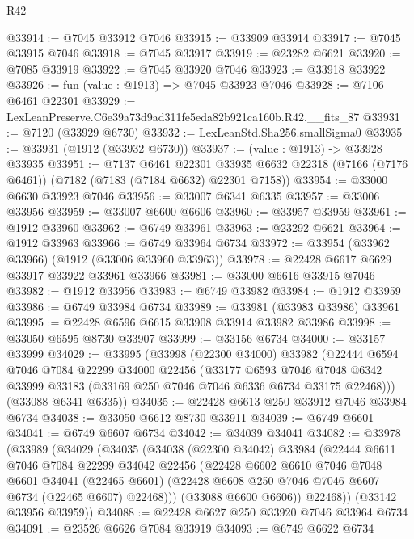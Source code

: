 \begin{lexlean}{R42}
\begin{coremodule}
{@33914 := @7045 @33912 @7046
@33915 := @33909 @33914
@33917 := @7045 @33915 @7046
@33918 := @7045 @33917
@33919 := @23282 @6621
@33920 := @7085 @33919
@33922 := @7045 @33920 @7046
@33923 := @33918 @33922
@33926 := fun (value : @1913) => @7045 @33923 @7046
@33928 := @7106 @6461 @22301
@33929 := LexLeanPreserve.C6e39a73d9ad311fe5eda82b921ca160b.R42.__fits_87
@33931 := @7120 (@33929 @6730)
@33932 := LexLeanStd.Sha256.smallSigma0
@33935 := @33931 (@1912 (@33932 @6730))
@33937 := (value : @1913) -> @33928 @33935
@33951 := @7137
    @6461
    @22301
    @33935
    @6632
    @22318
    (@7166 (@7176 @6461))
    (@7182 (@7183 (@7184 @6632) @22301 @7158))
@33954 := @33000 @6630 @33923 @7046
@33956 := @33007 @6341 @6335
@33957 := @33006 @33956
@33959 := @33007 @6600 @6606
@33960 := @33957 @33959
@33961 := @1912 @33960
@33962 := @6749 @33961
@33963 := @23292 @6621
@33964 := @1912 @33963
@33966 := @6749 @33964 @6734
@33972 := @33954 (@33962 @33966) (@1912 (@33006 @33960 @33963))
@33978 := @22428 @6617 @6629 @33917 @33922 @33961 @33966
@33981 := @33000 @6616 @33915 @7046
@33982 := @1912 @33956
@33983 := @6749 @33982
@33984 := @1912 @33959
@33986 := @6749 @33984 @6734
@33989 := @33981 (@33983 @33986) @33961
@33995 := @22428 @6596 @6615 @33908 @33914 @33982 @33986
@33998 := @33050 @6595 @8730 @33907
@33999 := @33156 @6734
@34000 := @33157 @33999
@34029 := @33995
    (@33998
      (@22300 @34000)
      @33982
      (@22444
        @6594
        @7046
        @7084
        @22299
        @34000
        @22456
        (@33177
          @6593
          @7046
          @7048
          @6342
          @33999
          @33183
          (@33169 @250 @7046 @7046 @6336 @6734 @33175 @22468)))
      (@33088 @6341 @6335))
@34035 := @22428 @6613 @250 @33912 @7046 @33984 @6734
@34038 := @33050 @6612 @8730 @33911
@34039 := @6749 @6601
@34041 := @6749 @6607 @6734
@34042 := @34039 @34041
@34082 := @33978
    (@33989
      (@34029
        (@34035
          (@34038
            (@22300 @34042)
            @33984
            (@22444
              @6611
              @7046
              @7084
              @22299
              @34042
              @22456
              (@22428
                @6602
                @6610
                @7046
                @7048
                @6601
                @34041
                (@22465 @6601)
                (@22428 @6608 @250 @7046 @7046 @6607 @6734 (@22465 @6607) @22468)))
            (@33088 @6600 @6606))
          @22468))
      (@33142 @33956 @33959))
@34088 := @22428 @6627 @250 @33920 @7046 @33964 @6734
@34091 := @23526 @6626 @7084 @33919
@34093 := @6749 @6622 @6734
}
\end{coremodule}
\end{lexlean}
